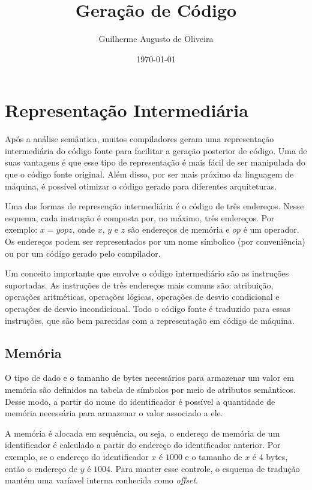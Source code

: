 \documentclass[12pt,a4paper]{article}
\title{Geração de Código}
\author{Guilherme Augusto de Oliveira}
\date{\today}
\begin{document}
\maketitle

\section{Representação Intermediária}

Após a análise semântica, muitos compiladores geram uma representação intermediária do código fonte para facilitar a geração posterior de código. Uma de suas vantagens é que esse tipo de representação é mais fácil de ser manipulada do que o código fonte original. Além disso, por ser mais próximo da linguagem de máquina, é possível otimizar o código gerado para diferentes arquiteturas.

Uma das formas de represenção intermediária é o código de três endereços. Nesse esquema, cada instrução é composta por, no máximo, três endereços. Por exemplo: $ x = y op z $, onde $ x $, $ y $ e $ z $ são endereços de memória e $ op $ é um operador. Os endereços podem ser representados por um nome símbolico (por conveniência) ou por um código gerado pelo compilador.

Um conceito importante que envolve o código intermediário são as instruções suportadas. As instruções de três endereços mais comuns são: atribuição, operações aritméticas, operações lógicas, operações de desvio condicional e operações de desvio incondicional. Todo o código fonte é traduzido para essas instruções, que são bem parecidas com a representação em código de máquina.

\subsection{Memória}

O tipo de dado e o tamanho de bytes necessários para armazenar um valor em memória são definidos na tabela de símbolos por meio de atributos semânticos. Desse modo, a partir do nome do identificador é possível a quantidade de memória necessária para armazenar o valor associado a ele.

A memória é alocada em sequência, ou seja, o endereço de memória de um identificador é calculado a partir do endereço do identificador anterior. Por exemplo, se o endereço do identificador $ x $ é $ 1000 $ e o tamanho de $ x $ é $ 4 $ bytes, então o endereço de $ y $ é $ 1004 $. Para manter esse controle, o esquema de tradução mantém uma varíavel interna conhecida como \textit{offset}.
\end{document}
